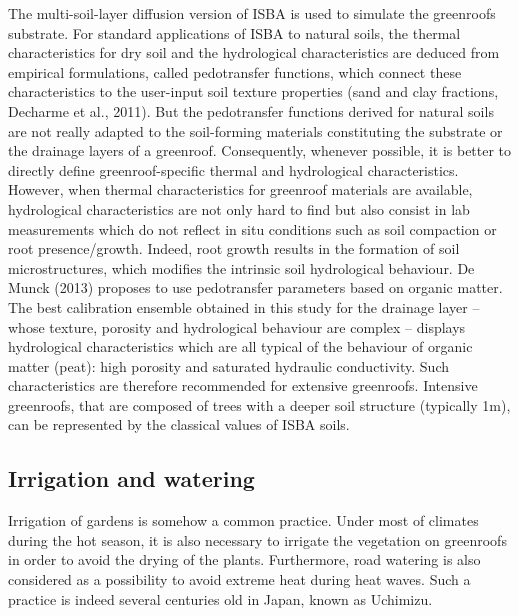 The multi-soil-layer diffusion version of ISBA is used to simulate the greenroofs substrate.
For standard applications of ISBA to natural soils, the thermal  characteristics  for  dry  soil  and  the  hydrological  characteristics are deduced from empirical formulations, called pedotransfer  functions,  which  connect  these  characteristics to the user-input soil texture properties (sand and clay fractions,  Decharme  et  al.,  2011\nocite{decharme2011}).  But  the  pedotransfer  functions  derived  for  natural  soils  are  not  really  adapted  to the  soil-forming  materials  constituting  the  substrate  or  the drainage layers of a greenroof. Consequently, whenever possible, it is better to directly define greenroof-specific thermal and hydrological characteristics. However,  when  thermal  characteristics  for  greenroof  materials are available, hydrological characteristics are not only hard to find but also consist in lab measurements which do not reflect in situ conditions such as soil compaction or root presence/growth. Indeed, root growth results in the formation of soil microstructures, which modifies the intrinsic soil hydrological behaviour. 
De Munck \etal (2013)\nocite{demunck2013} proposes to use pedotransfer parameters based on organic matter. The best calibration  ensemble  obtained in this study for  the drainage  layer  –  whose  texture,  porosity  and  hydrological behaviour are complex – displays hydrological characteristics which are all typical of the behaviour of organic matter (peat): high porosity and saturated hydraulic conductivity. Such characteristics are therefore recommended for extensive greenroofs. Intensive greenroofs, that are composed of trees with a deeper soil structure (typically 1m), can be represented by the classical values of ISBA soils. \\


\subsection{Irrigation and watering}

Irrigation of gardens is somehow a common practice. Under most of climates during the hot season, it is also necessary to irrigate the vegetation on greenroofs in order to avoid the drying of the plants. Furthermore, road watering is also considered as a possibility to avoid extreme heat during heat waves. Such a practice is indeed several centuries old in Japan, known as Uchimizu. \\

